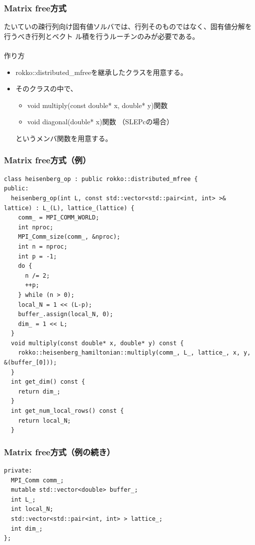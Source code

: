 \begin{frame}[c,fragile]
  \frametitle{Matrix free方式}
たいていの疎行列向け固有値ソルバでは、行列そのものではなく、固有値分解を行うべき行列とベクト
ル積を行うルーチンのみが必要である。
　\\
　\\
\noindent
作り方
  \begin{itemize}
  \item rokko::distributed_mfreeを継承したクラスを用意する。
  \item そのクラスの中で、
     \begin{itemize}
     \item void multiply(const double* x, double* y)関数
     \item void diagonal(double* x)関数 （SLEPcの場合） 
     \end{itemize}
というメンバ関数を用意する。
  \end{itemize}
\end{frame}

\begin{frame}[c,fragile]
  \frametitle{Matrix free方式（例）}
\begin{lstlisting}
class heisenberg_op : public rokko::distributed_mfree {
public:
  heisenberg_op(int L, const std::vector<std::pair<int, int> >& lattice) : L_(L), lattice_(lattice) {
    comm_ = MPI_COMM_WORLD;
    int nproc;
    MPI_Comm_size(comm_, &nproc);
    int n = nproc;
    int p = -1;
    do {
      n /= 2;
      ++p;
    } while (n > 0);
    local_N = 1 << (L-p);
    buffer_.assign(local_N, 0);
    dim_ = 1 << L;
  }
  void multiply(const double* x, double* y) const {
    rokko::heisenberg_hamiltonian::multiply(comm_, L_, lattice_, x, y, &(buffer_[0]));
  }
  int get_dim() const {
    return dim_;
  }
  int get_num_local_rows() const {
    return local_N;
  }
\end{lstlisting}
\end{frame}

\begin{frame}[c,fragile]
  \frametitle{Matrix free方式（例の続き）}
\begin{lstlisting}
private:
  MPI_Comm comm_;
  mutable std::vector<double> buffer_;
  int L_;
  int local_N;
  std::vector<std::pair<int, int> > lattice_;
  int dim_;
};
\end{lstlisting}
\end{frame}


